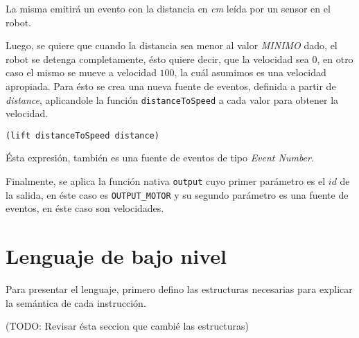 La misma emitirá un evento con la distancia en \emph{cm} leída
por un sensor en el robot.

  Luego, se quiere que cuando la distancia sea menor al valor
\emph{MINIMO} dado, el robot se detenga completamente, ésto
quiere decir, que la velocidad sea $0$, en otro caso el mismo
se mueve a velocidad $100$, la cuál asumimos es una velocidad
apropiada.
  Para ésto se crea una nueva fuente de eventos, definida a partir
de \emph{distance}, aplicandole la función \texttt{distanceToSpeed} 
a cada valor para obtener la velocidad.

\begin{verbatim}
(lift distanceToSpeed distance)
\end{verbatim}

  Ésta expresión, también es una fuente de eventos
de tipo \emph{Event Number}.

  Finalmente, se aplica la función nativa \texttt{output} cuyo
primer parámetro es el $id$ de la salida, en éste caso es \texttt{OUTPUT\_MOTOR}
y su segundo parámetro es una fuente de eventos,
en éste caso son velocidades.


\section{Lenguaje de bajo nivel}

 Para presentar el lenguaje, primero defino las estructuras
necesarias para explicar la semántica de cada instrucción.

(TODO: Revisar ésta seccion que cambié las estructuras)

